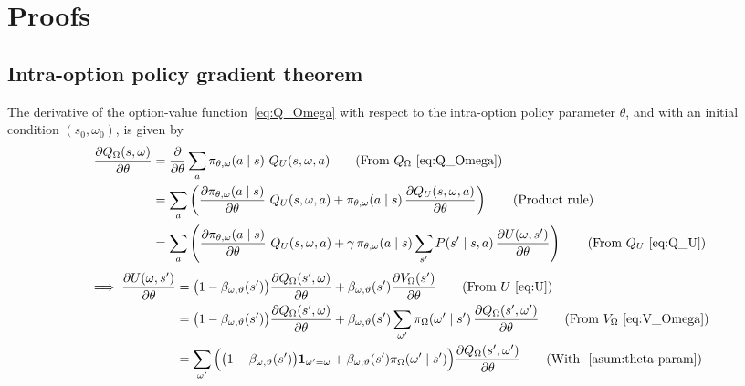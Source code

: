 \section{Proofs}

\subsection{Intra-option policy gradient theorem~\cite{bacon2017option}}

The derivative of the option-value function~\eqref{eq:Q_Omega} with respect to the intra-option policy parameter \( \theta \), and with an initial condition \( (s_0, \omega_0) \), is given by
\begin{align}
    \frac{\partial Q_\Omega(s, \omega)}{\partial \theta}
     & =
    \frac{\partial}{\partial \theta} \sum_{a} \pi_{\theta, \omega}(a \mid s) \ Q_U(s, \omega, a)
    \tag{From \( Q_\Omega \)~\eqref{eq:Q_Omega}}
    \\ & =
    \sum_{a} \left( \frac{\partial \pi_{\theta, \omega}(a \mid s)}{\partial \theta}  \ Q_U(s, \omega, a) + \pi_{\theta, \omega}(a \mid s) \, \frac{\partial Q_U(s, \omega, a)}{\partial \theta} \right)
    \tag{Product rule}
    \\ & =
    \sum_{a} \left( \frac{\partial \pi_{\theta, \omega}(a \mid s)}{\partial \theta}  \ Q_U(s, \omega, a) + \gamma \, \pi_{\theta, \omega}(a \mid s) \sum_{s'} P(s' \mid s, a) \, \frac{\partial U(\omega, s')}{\partial \theta} \right)
    \tag{From \( Q_U \)~\eqref{eq:Q_U}}
\end{align}
\begin{align}
    \implies
    \frac{\partial U(\omega, s')}{\partial \theta}
     & =
    \big( 1 - \beta_{\omega, \vartheta}(s') \big) \frac{\partial Q_\Omega(s', \omega)}{\partial \theta} + \beta_{\omega, \vartheta}(s') \frac{\partial V_\Omega(s')}{\partial \theta}
    \tag{From \( U \)~\eqref{eq:U}}
    \\ & =
    \big( 1 - \beta_{\omega, \vartheta}(s') \big) \frac{\partial Q_\Omega(s', \omega)}{\partial \theta} + \beta_{\omega, \vartheta}(s') \sum_{\omega'} \pi_\Omega(\omega' \mid s') \, \frac{\partial Q_\Omega(s', \omega')}{\partial \theta}
    \tag{From \( V_\Omega \)~\eqref{eq:V_Omega}}
    \\ & =
    \sum_{\omega'} \Big( \big( 1 - \beta_{\omega, \vartheta}(s') \big) \mathbf{1}_{\omega' = \omega} + \beta_{\omega, \vartheta}(s') \pi_\Omega(\omega' \mid s') \Big) \frac{\partial Q_\Omega(s', \omega')}{\partial \theta}
    \tag{With ~\ref{asum:theta-param}}
\end{align}
